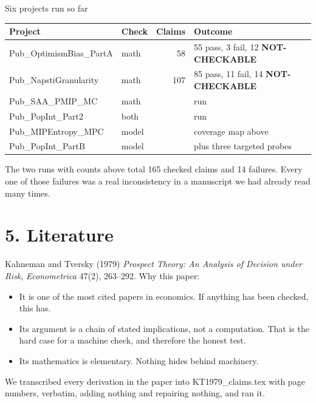 \documentclass[aspectratio=169,11pt]{beamer}
\newcommand{\code}[1]{{\ttfamily\small #1}}
\newcommand{\NC}{{\color{slate}\bfseries NOT-CHECKABLE}}
\begin{document}
\begin{frame}{Six projects run so far}
  \begin{center}
  {\small
  \begin{tabular}{@{}llrl@{}}
    \toprule
    \textbf{Project} & \textbf{Check} & \textbf{Claims} & \textbf{Outcome} \\
    \midrule
    \code{Pub\_OptimismBias\_PartA} & math  & 58  & 55 pass, 3 fail, 12 \NC \\
    \code{Pub\_NapstiGranularity}   & math  & 107 & 85 pass, 11 fail, 14 \NC \\
    \code{Pub\_SAA\_PMIP\_MC}       & math  &     & run \\
    \code{Pub\_PopInt\_Part2}       & both  &     & run \\
    \code{Pub\_MIPEntropy\_MPC}     & model &     & coverage map above \\
    \code{Pub\_PopInt\_PartB}       & model &     & plus three targeted probes \\
    \bottomrule
  \end{tabular}}
  \end{center}
  \vfill
  The two runs with counts above total 165 checked claims and 14 failures. Every one of those
  failures was a real inconsistency in a manuscript we had already read many times.
\end{frame}

\section{5. Literature}
\begin{frame}[plain]
  \vfill{}\vfill
\end{frame}

\begin{frame}{Kahneman and Tversky (1979)}
  \emph{Prospect Theory: An Analysis of Decision under Risk}, \emph{Econometrica} 47(2), 263--292.
  \vfill
  Why this paper:
  \begin{itemize}\itemsep0.4em
    \item It is one of the most cited papers in economics. If anything has been checked, this has.
    \item Its argument is a \alert{chain of stated implications}, not a computation. That is the
          hard case for a machine check, and therefore the honest test.
    \item Its mathematics is elementary. Nothing hides behind machinery.
  \end{itemize}
  \vfill
  We transcribed every derivation in the paper into \code{KT1979\_claims.tex} with page numbers,
  verbatim, adding nothing and repairing nothing, and ran it.
\end{frame}
\end{document}
